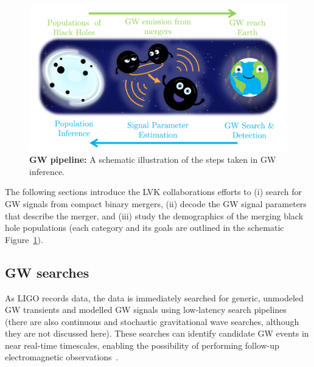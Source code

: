\begin{figure}
\begin{center}
  \centerline{\includegraphics[width=1.1\linewidth]{src/figures/gw_pipeline.png}}
  \caption{\textbf{GW pipeline:} A schematic illustration of the steps taken in GW inference. }
  \label{fig:gw_pipeline}
\end{center}
\end{figure}

The following sections introduce the LVK collaborations efforts to (i) search for GW signals from compact binary mergers, (ii) decode the GW signal parameters that describe the merger, and (iii) study the demographics of the merging black hole populations (each category and its goals are outlined in the schematic Figure~\ref{fig:gw_pipeline}).


\subsection{GW searches}  \label{sec:searches}

As LIGO records data, the data is immediately searched for generic, unmodeled  GW transients and modelled GW signals using low-latency search pipelines (there are also continuous and stochastic gravitational wave searches, although they are not discussed here). 
These searches can identify candidate GW events in near real-time timescales, enabling the possibility of performing follow-up electromagnetic observations~\cite{abbott2018prospects, gw_search_review}.

